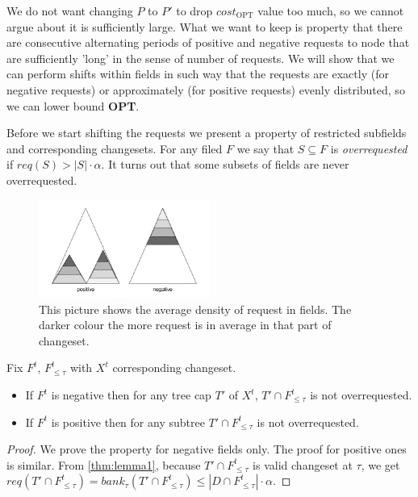 We do not want changing $P$ to $P'$ to drop $cost_{\mathrm{OPT}}$ value too 
much, so we cannot 
argue about it is sufficiently large. What we want to keep is property that 
there are consecutive alternating periods of positive and negative 
requests to node that are sufficiently 'long' in the sense of number of 
requests. 
We will show that we can perform shifts within fields in such way 
that the requests are exactly (for negative requests) or approximately (for 
positive 
requests) evenly distributed, so we can lower bound \textbf{OPT}.

Before we start shifting the requests we present a property of restricted 
subfields and corresponding changesets. For any filed $F$ we say that $S 
\subseteq F$ is \textit{overrequested} if $req(S) > |S| \cdot \alpha$. It turns 
out that some subsets of fields are never overrequested.
\begin{figure}
\vspace{-20pt}
 \begin{center}
  \includegraphics[width=0.5\textwidth]{density_pic.png}
\end{center}
\caption{This picture shows the average density of request in fields. The 
darker colour the more request is in average in that part of changeset.}
\vspace{-40pt}
\label{fig:density}
\end{figure}
\begin{lemma}
Fix $F^t$, $F^t_{\leq \tau}$ with $X^t$ corresponding changeset.
\begin{itemize}
 \item If $F^t$ is negative then for any tree cap $T'$ of $X^t$, $T' \cap 
F^t_{\leq \tau}$ is not overrequested.
\item If $F^t$ is positive then for any subtree $T'\cap F^t_{\leq \tau}$ is not 
overrequested.
\end{itemize}
\label{thm:not_over_requested}
\end{lemma}
\begin{proof}
We prove the property for negative fields only. The proof for positive ones is 
similar. From \ref{thm:lemma1}, because $T' \cap  F^t_{\leq \tau}$ is valid 
changeset at $\tau$, we get $req(T' \cap  F^t_{\leq \tau}) = bank_{\tau}(T' 
\cap F^t_{\leq \tau}) \leq |D \cap F^t_{\leq \tau}| \cdot \alpha$.
\end{proof}
